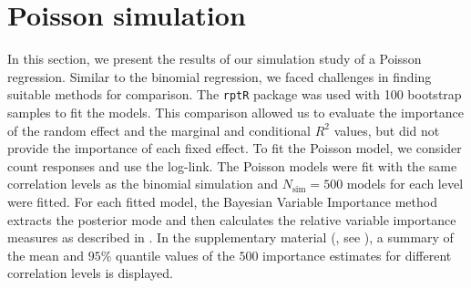 \section{Poisson simulation}
In this section, we present the results of our simulation study of a Poisson regression. Similar to the binomial regression, we faced challenges in finding suitable methods for comparison. The \texttt{rptR} package was used with 100 bootstrap samples to fit the models. This comparison allowed us to evaluate the importance of the random effect and the marginal and conditional \( R^2 \) values, but did not provide the importance of each fixed effect. To fit the Poisson model, we consider count responses and use the log-link. The Poisson models were fit with the same correlation levels as the binomial simulation and $N_{\text{sim}}=500$ models for each level were fitted. For each fitted model, the Bayesian Variable Importance method extracts the posterior mode and then calculates the relative variable importance measures as described in . In the supplementary material (, see ), a summary of the mean and $95\%$ quantile values of the $500$ importance estimates for different correlation levels is displayed.
